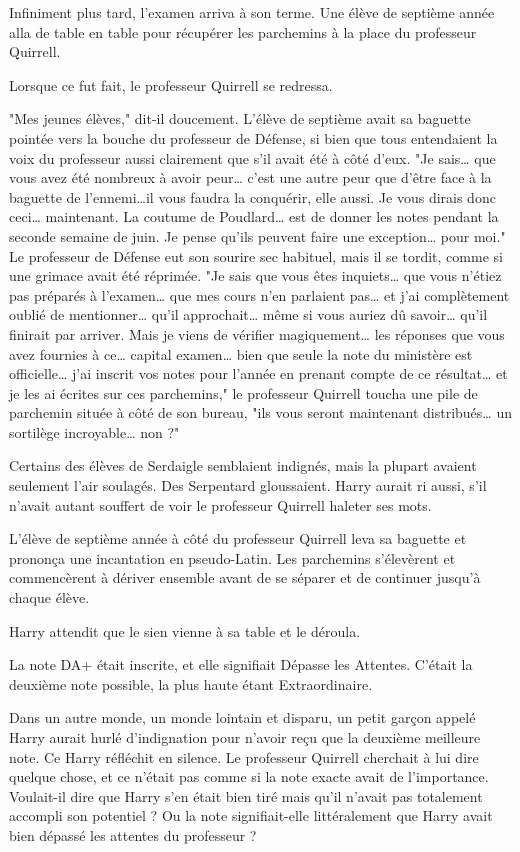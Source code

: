 Infiniment plus tard, l'examen arriva à son terme. Une élève de septième année alla de table en table pour récupérer les parchemins à la place du professeur Quirrell.

Lorsque ce fut fait, le professeur Quirrell se redressa.

"Mes jeunes élèves," dit-il doucement. L'élève de septième avait sa baguette pointée vers la bouche du professeur de Défense, si bien que tous entendaient la voix du professeur aussi clairement que s'il avait été à côté d'eux. "Je sais… que vous avez été nombreux à avoir peur… c'est une autre peur que d'être face à la baguette de l'ennemi…il vous faudra la conquérir, elle aussi. Je vous dirais donc ceci… maintenant. La coutume de Poudlard… est de donner les notes pendant la seconde semaine de juin. Je pense qu'ils peuvent faire une exception… pour moi." Le professeur de Défense eut son sourire sec habituel, mais il se tordit, comme si une grimace avait été réprimée. "Je sais que vous êtes inquiets… que vous n'étiez pas préparés à l'examen… que mes cours n'en parlaient pas… et j'ai complètement oublié de mentionner… qu'il approchait… même si vous auriez dû savoir… qu'il finirait par arriver. Mais je viens de vérifier magiquement… les réponses que vous avez fournies à ce… capital examen… bien que seule la note du ministère est officielle… j'ai inscrit vos notes pour l'année en prenant compte de ce résultat… et je les ai écrites sur ces parchemins," le professeur Quirrell toucha une pile de parchemin située à côté de son bureau, "ils vous seront maintenant distribués… un sortilège incroyable… non ?"

Certains des élèves de Serdaigle semblaient indignés, mais la plupart avaient seulement l'air soulagés. Des Serpentard gloussaient. Harry aurait ri aussi, s'il n'avait autant souffert de voir le professeur Quirrell haleter ses mots.

L'élève de septième année à côté du professeur Quirrell leva sa baguette et prononça une incantation en pseudo-Latin. Les parchemins s'élevèrent et commencèrent à dériver ensemble avant de se séparer et de continuer jusqu'à chaque élève.

Harry attendit que le sien vienne à sa table et le déroula.

La note DA+ était inscrite, et elle signifiait Dépasse les Attentes. C'était la deuxième note possible, la plus haute étant Extraordinaire.

Dans un autre monde, un monde lointain et disparu, un petit garçon appelé Harry aurait hurlé d'indignation pour n'avoir reçu que la deuxième meilleure note. Ce Harry réfléchit en silence. Le professeur Quirrell cherchait à lui dire quelque chose, et ce n'était pas comme si la note exacte avait de l'importance. Voulait-il dire que Harry s'en était bien tiré mais qu'il n'avait pas totalement accompli son potentiel ? Ou la note signifiait-elle littéralement que Harry avait bien dépassé les attentes du professeur ?

